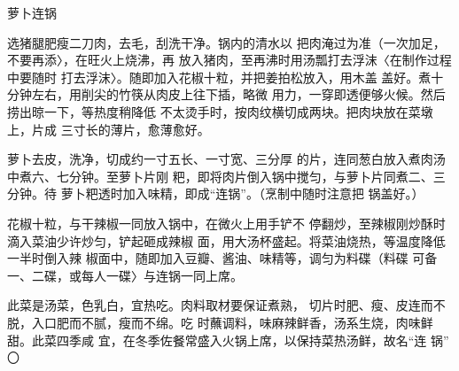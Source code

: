 \begin{recipe}{萝卜连锅}

\ingredients




\cooking

\step 	选猪腿肥瘦二刀肉，去毛，刮洗干净。锅内的清水以 把肉淹过为准（一次加足，不要再添〉，在旺火上烧沸，再 放入猪肉，至再沸时用汤瓢打去浮沫〈在制作过程中要随时 打去浮沫〉。随即加入花椒十粒，并把姜拍松放入，用木盖 盖好。煮十分钟左右，用削尖的竹筷从肉皮上往下插，略微 用力，一穿即透便够火候。然后捞出晾一下，等热度稍降低 不太烫手时，按肉纹横切成两块。把肉块放在菜墩上，片成 三寸长的薄片，愈薄愈好。

\step 	萝卜去皮，洗净，切成约一寸五长、一寸宽、三分厚 的片，连同葱白放入煮肉汤中煮六、七分钟。至萝卜片刚 粑，即将肉片倒入锅中搅匀，与萝卜片同煮二、三分钟。待 萝卜粑透时加入味精，即成“连锅”。（烹制中随时注意把 锅盖好。）

\step 	花椒十粒，与干辣椒一同放入锅中，在微火上用手铲不 停翻炒，至辣椒刚炒酥时滴入菜油少许炒匀，铲起砸成辣椒 面，用大汤杯盛起。将菜油烧热，等温度降低一半时倒入辣 椒面中，随即加入豆瓣、酱油、味精等，调匀为料碟（料碟 可备一、二碟，或每人一碟〉与连锅一同上席。

\notes

此菜是汤菜，色乳白，宜热吃。肉料取材要保证煮熟， 切片时肥、瘦、皮连而不脱，入口肥而不腻，瘦而不绵。吃 时蘸调料，味麻辣鲜香，汤系生烧，肉味鲜甜。此菜四季咸 宜，在冬季佐餐常盛入火锅上席，以保持菜热汤鲜，故名“连 锅” 〇

\end{recipe}

